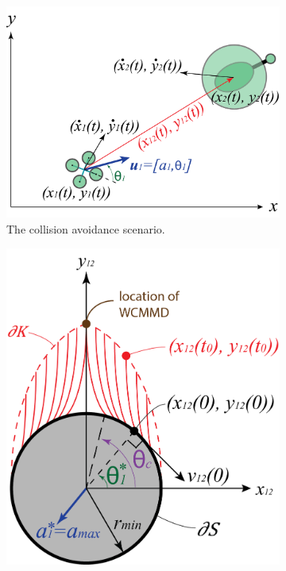 \documentclass[journal,11pt,onecolumn,draftclsnofoot,]{IEEEtran}
\begin{document}
%


\begin{figure}
    \centering
    \begin{subfigure}[b]{.45\columnwidth}
        \centering
        \includegraphics[width=\columnwidth]{problem_description}
        \caption{The collision avoidance scenario.}
        \label{fig:problem_description}
    \end{subfigure}%
	\hfill
    \begin{subfigure}[b]{.45\columnwidth}
        \centering
        \includegraphics[width=.8\columnwidth]{safety_set}

\end{subfigure}
\end{figure}
\end{document}

